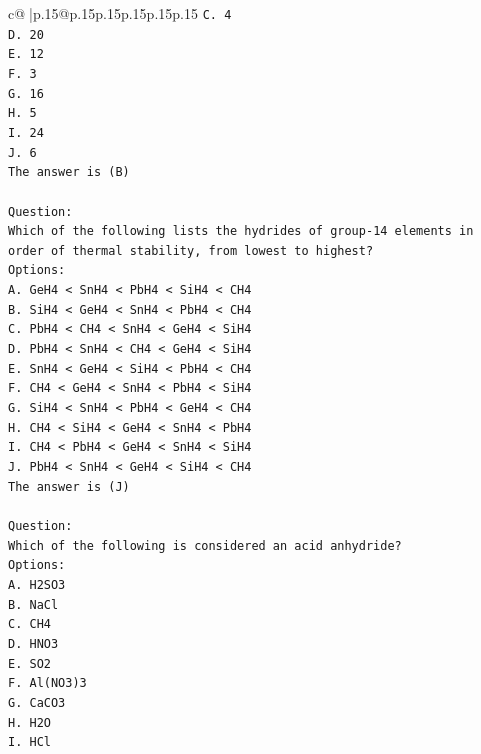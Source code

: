 \documentclass{article}
\begin{document}
{\begin{supertabular}{c@{$\;$}|p{.15\linewidth}@{}p{.15\linewidth}p{.15\linewidth}p{.15\linewidth}p{.15\linewidth}p{.15\linewidth}}
{{{\texttt{C. 4} \\
\texttt{D. 20} \\
\texttt{E. 12} \\
\texttt{F. 3} \\
\texttt{G. 16} \\
\texttt{H. 5} \\
\texttt{I. 24} \\
\texttt{J. 6} \\
\texttt{The answer is (B)} \\
\\ 
\texttt{Question:} \\
\texttt{Which of the following lists the hydrides of group{-}14 elements in order of thermal stability, from lowest to highest?} \\
\texttt{Options:} \\
\texttt{A. GeH4 < SnH4 < PbH4 < SiH4 < CH4} \\
\texttt{B. SiH4 < GeH4 < SnH4 < PbH4 < CH4} \\
\texttt{C. PbH4 < CH4 < SnH4 < GeH4 < SiH4} \\
\texttt{D. PbH4 < SnH4 < CH4 < GeH4 < SiH4} \\
\texttt{E. SnH4 < GeH4 < SiH4 < PbH4 < CH4} \\
\texttt{F. CH4 < GeH4 < SnH4 < PbH4 < SiH4} \\
\texttt{G. SiH4 < SnH4 < PbH4 < GeH4 < CH4} \\
\texttt{H. CH4 < SiH4 < GeH4 < SnH4 < PbH4} \\
\texttt{I. CH4 < PbH4 < GeH4 < SnH4 < SiH4} \\
\texttt{J. PbH4 < SnH4 < GeH4 < SiH4 < CH4} \\
\texttt{The answer is (J)} \\
\\ 
\texttt{Question:} \\
\texttt{Which of the following is considered an acid anhydride?} \\
\texttt{Options:} \\
\texttt{A. H2SO3} \\
\texttt{B. NaCl} \\
\texttt{C. CH4} \\
\texttt{D. HNO3} \\
\texttt{E. SO2} \\
\texttt{F. Al(NO3)3} \\
\texttt{G. CaCO3} \\
\texttt{H. H2O} \\
\texttt{I. HCl} \\
}}}
\end{supertabular}}
\end{document}
